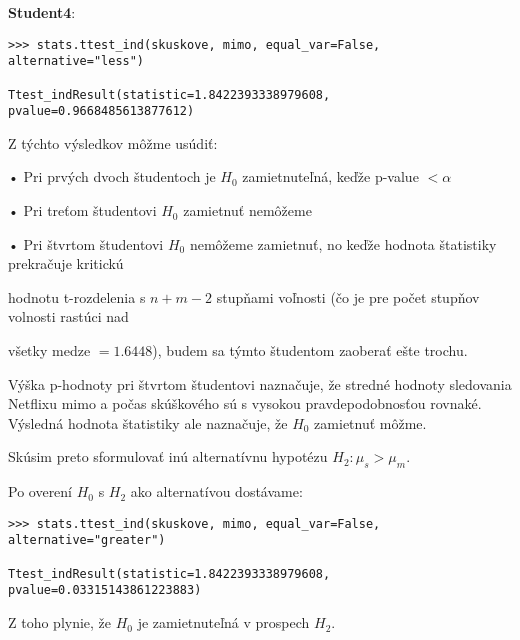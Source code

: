 \documentclass[10pt,a4paper]{article}
\begin{document}
\textbf{Student4}:

\begin{lstlisting}
>>> stats.ttest_ind(skuskove, mimo, equal_var=False, alternative="less")

Ttest_indResult(statistic=1.8422393338979608, pvalue=0.9668485613877612)
\end{lstlisting}

\vspace{2mm}
Z týchto výsledkov môžme usúdiť:

\hspace{3mm} • Pri prvých dvoch študentoch je $H_0$ zamietnuteľná, keďže p-value $< \alpha$

\hspace{3mm} • Pri treťom študentovi $H_0$ zamietnuť nemôžeme


\hspace{3mm} • Pri štvrtom študentovi $H_0$ nemôžeme zamietnuť, no keďže hodnota štatistiky prekračuje kritickú 

\hspace{6mm} hodnotu t-rozdelenia s $n+m-2$ stupňami voľnosti (čo je pre počet stupňov volnosti rastúci nad 

\hspace{6mm} všetky medze $=1.6448$), budem sa týmto študentom zaoberať ešte trochu.

\vspace{2mm}
Výška p-hodnoty pri štvrtom študentovi naznačuje, že stredné hodnoty sledovania Netflixu mimo a počas skúškového sú s vysokou pravdepodobnosťou rovnaké. Výsledná hodnota štatistiky ale naznačuje, že $H_0$ zamietnuť môžme.

Skúsim preto sformulovať inú alternatívnu hypotézu $H_2: \mu_s > \mu_m$.

Po overení $H_0$ s $H_2$ ako alternatívou dostávame:

\begin{lstlisting}
>>> stats.ttest_ind(skuskove, mimo, equal_var=False, alternative="greater")

Ttest_indResult(statistic=1.8422393338979608, pvalue=0.03315143861223883)
\end{lstlisting}

Z toho plynie, že $H_0$ je zamietnuteľná v prospech $H_2$.

\pagebreak
\end{document}
